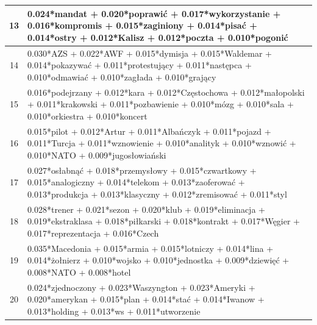 \documentclass[11pt,a4paper]{article}
\begin{document}
\begin{table}[h]
\begin{tabular}{|c|>{\footnotesize}p{\linewidth}|}
13 & 0.024*mandat + 0.020*poprawić + 0.017*wykorzystanie + 0.016*kompromis + 0.015*zaginiony + 0.014*pisać + 0.014*ostry + 0.012*Kalisz + 0.012*poczta + 0.010*pogonić\\\hline
14 & 0.030*AZS + 0.022*AWF + 0.015*dymisja + 0.015*Waldemar + 0.014*pokazywać + 0.011*protestujący + 0.011*następca + 0.010*odmawiać + 0.010*zagłada + 0.010*grający\\\hline
15 & 0.016*podejrzany + 0.012*kara + 0.012*Częstochowa + 0.012*małopolski + 0.011*krakowski + 0.011*pozbawienie + 0.010*mózg + 0.010*sala + 0.010*orkiestra + 0.010*koncert\\\hline
16 & 0.015*pilot + 0.012*Artur + 0.011*Albańczyk + 0.011*pojazd + 0.011*Turcja + 0.011*wznowienie + 0.010*analityk + 0.010*wznowić + 0.010*NATO + 0.009*jugosłowiański\\\hline
17 & 0.027*osłabnąć + 0.018*przemysłowy + 0.015*czwartkowy + 0.015*analogiczny + 0.014*telekom + 0.013*zaoferować + 0.013*produkcja + 0.013*klasyczny + 0.012*zremisować + 0.011*styl\\\hline
18 & 0.028*trener + 0.021*sezon + 0.020*klub + 0.019*eliminacja + 0.019*ekstraklasa + 0.018*piłkarski + 0.018*kontrakt + 0.017*Węgier + 0.017*reprezentacja + 0.016*Czech\\\hline
19 & 0.035*Macedonia + 0.015*armia + 0.015*lotniczy + 0.014*lina + 0.014*żołnierz + 0.010*wojsko + 0.010*jednostka + 0.009*dziewięć + 0.008*NATO + 0.008*hotel\\\hline
20 & 0.024*zjednoczony + 0.023*Waszyngton + 0.023*Ameryki + 0.020*amerykan + 0.015*plan + 0.014*stać + 0.014*Iwanow + 0.013*holding + 0.013*ws + 0.011*utworzenie\\\hline

\end{tabular}
\end{table}
\end{document}
